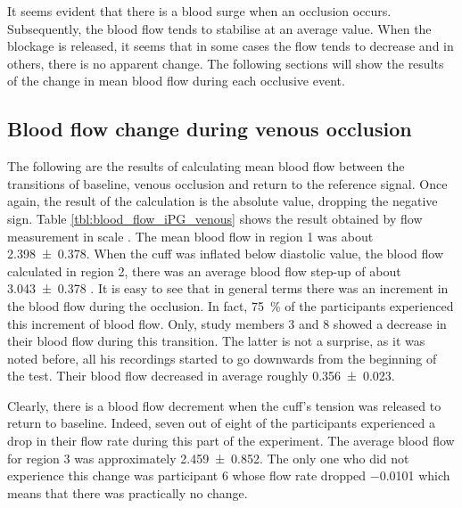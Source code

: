 It seems evident that there is a blood surge when an occlusion occurs. Subsequently, the blood flow tends to stabilise at an average value. When the blockage is released, it seems that in some cases the flow tends to decrease and in others, there is no apparent change. The following sections will show the results of the change in mean blood flow during each occlusive event.


\subsection{Blood flow change during venous occlusion}
\label{sectio results 5.1}
The following are the results of calculating mean blood flow between the transitions of baseline, venous occlusion and return to the reference signal. Once again, the result of the calculation is the absolute value, dropping the negative sign. Table \ref{tbl:blood_flow_iPG_venous} shows the result obtained by flow measurement in scale \si{\bfv}. The mean blood flow in region 1 was about \SI{2.398(0378)}{\bfv}. When the cuff was inflated below diastolic value, the blood flow calculated in region 2, there was an average blood flow step-up of about \SI{3.043(0378)}{\bfv} . It is easy to see that in general terms there was an increment in the blood flow during the occlusion. In fact, \SI{75}{\percent} of the participants experienced this increment of blood flow. Only, study members 3 and 8 showed a decrease in their blood flow during this transition. The latter is not a surprise, as it was noted before, all his recordings started to go downwards from the beginning of the test. Their  blood flow decreased in average roughly \SI{0.356(0023)}{\bfv}.

Clearly, there is a blood flow decrement when the cuff's tension was released to return to baseline. Indeed, seven out of eight of the participants experienced a drop in their flow rate during this part of the experiment. The average blood flow for region 3 was approximately \SI{2.459(0852)}{\bfv}. The only one who did not experience this change was participant 6 whose flow rate dropped \SI{-0.0101}{\bfv} which means that there was practically no change. 

